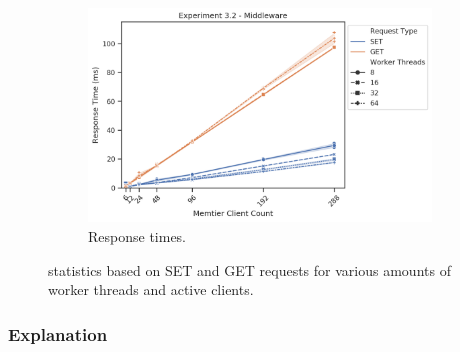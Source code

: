 \begin{figure}
{                \centering
                \begin{subfigure}[t!]{0.55\textwidth}
                    \centering
                    \includegraphics[width=1\textwidth]{../data_analysis/figures/3-2_mw_response_time.png}
                    \caption{Response times.\label{fig:double_mw_rt}}
                \end{subfigure}
            }
            \caption{\mw{} statistics based on SET and GET requests for various amounts of worker threads and active
                     clients.\label{fig:double_mw_all}}
        \end{figure}

        \subsubsection{Explanation\label{subsubsec:3_two-middlewares_summary}}

